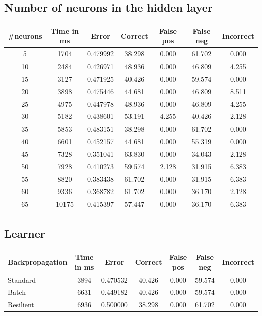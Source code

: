 \documentclass[12pt,a4,notitlepage]{report}
\renewcommand{\_}{\texttt{\symbol{95}}}
\newcommand{\<}{\texttt{\symbol{60}}}
\renewcommand{\>}{\texttt{\symbol{62}}}
\begin{document}
\subsection{Number of neurons in the hidden layer}

\begin{tabular}{c|cccccc}
\#neurons & Time in ms & Error & Correct & False pos & False neg & Incorrect \\ \hline
5 & 1704 & 0.479992 & 38.298 & 0.000 & 61.702 & 0.000 \\
10 & 2484 & 0.426971 & 48.936 & 0.000 & 46.809 & 4.255 \\
15 & 3127 & 0.471925 & 40.426 & 0.000 & 59.574 & 0.000 \\
20 & 3898 & 0.475446 & 44.681 & 0.000 & 46.809 & 8.511 \\
25 & 4975 & 0.447978 & 48.936 & 0.000 & 46.809 & 4.255 \\
30 & 5182 & 0.438601 & 53.191 & 4.255 & 40.426 & 2.128 \\
35 & 5853 & 0.483151 & 38.298 & 0.000 & 61.702 & 0.000 \\
40 & 6601 & 0.452157 & 44.681 & 0.000 & 55.319 & 0.000 \\
45 & 7328 & 0.351041 & 63.830 & 0.000 & 34.043 & 2.128 \\
50 & 7928 & 0.410273 & 59.574 & 2.128 & 31.915 & 6.383 \\
55 & 8820 & 0.383438 & 61.702 & 0.000 & 31.915 & 6.383 \\
60 & 9336 & 0.368782 & 61.702 & 0.000 & 36.170 & 2.128 \\
65 & 10175 & 0.415397 & 57.447 & 0.000 & 36.170 & 6.383 \\
\end{tabular}

\subsection{Learner}

\begin{tabular}{l|cccccc}
Backpropagation & Time in ms & Error & Correct & False pos & False neg & Incorrect \\ \hline
Standard & 3894 & 0.470532 & 40.426 & 0.000 & 59.574 & 0.000 \\
Batch & 6631 & 0.449182 & 40.426 & 0.000 & 59.574 & 0.000 \\
Resilient & 6936 & 0.500000 & 38.298 & 0.000 & 61.702 & 0.000 \\
\end{tabular}
\end{document}
